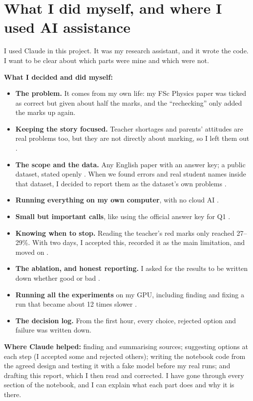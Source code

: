 \section{What I did myself, and where I used AI assistance}
\label{sec:ai-help}
I used Claude in this project. It was my research assistant, and it wrote the code. I want to be clear about
which parts were mine and which were not.

\textbf{What I decided and did myself:}
\begin{itemize}
  \item \textbf{The problem.} It comes from my own life: my FSc Physics paper was ticked as correct but given about half the
        marks, and the ``rechecking'' only added the marks up again.
  \item \textbf{Keeping the story focused.} Teacher shortages and parents' attitudes are real problems too, but they are not
        directly about marking, so I left them out .
  \item \textbf{The scope and the data.} Any English paper with an answer key; a public dataset, stated openly .
        When we found errors and real student names inside that dataset, I decided to report them as the dataset's own
        problems .
  \item \textbf{Running everything on my own computer}, with no cloud AI .
  \item \textbf{Small but important calls}, like using the official answer key for Q1 .
  \item \textbf{Knowing when to stop.} Reading the teacher's red marks only reached 27--29\%. With two days, I accepted this,
        recorded it as the main limitation, and moved on .
  \item \textbf{The ablation, and honest reporting.} I asked for the results to be written down whether good or bad .
  \item \textbf{Running all the experiments} on my GPU, including finding and fixing a run that became about 12 times
        slower .
  \item \textbf{The decision log.} From the first hour, every choice, rejected option and failure was written down.
\end{itemize}

\textbf{Where Claude helped:} finding and summarising sources; suggesting options at each step (I accepted some and rejected
others); writing the notebook code from the agreed design and testing it with a fake model before my real runs; and drafting this report, which I then read and corrected. I have gone through every section of the
notebook, and I can explain what each part does and why it is there.

